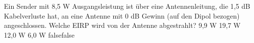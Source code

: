     {Ein Sender mit 8,5 W Ausgangsleistung ist über eine Antennenleitung, die 1,5 dB Kabelverluste hat, an eine Antenne mit 0 dB Gewinn (auf den Dipol bezogen) angeschlossen. Welche EIRP wird von der Antenne abgestrahlt?}
    {9,9 W}
    {19,7 W}
    {12,0 W}
    {6,0 W}
    {false}{false}